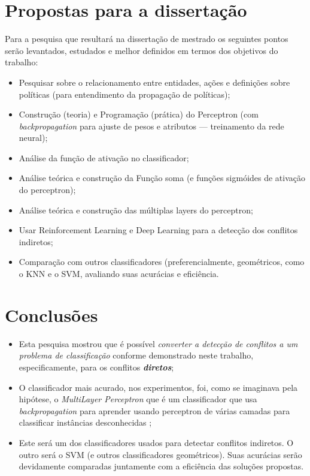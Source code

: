 \chapter{Propostas para a dissertação}\label{propostas}
Para a pesquisa que resultará na dissertação de mestrado os seguintes pontos serão levantados, estudados e melhor definidos em termos dos objetivos do trabalho:
\begin{itemize}
	\item Pesquisar sobre o relacionamento entre entidades, ações e definições sobre políticas (para entendimento da propagação de políticas);
	\item Construção (teoria) e Programação (prática) do Perceptron (com \textit{backpropagation} para ajuste de pesos e atributos --- treinamento da rede neural);
	\item Análise da função de ativação no classificador;
	\item Análise teórica e construção da Função soma (e funções sigmóides de ativação do perceptron);
	\item Análise teórica e construção das múltiplas layers do perceptron;
	\item Usar Reinforcement Learning e Deep Learning para a detecção dos conflitos indiretos;
	\item Comparação com outros classificadores (preferencialmente, geométricos, como o KNN e o SVM, avaliando suas acurácias e eficiência.
\end{itemize}

\chapter{Conclusões}\label{conclusoes}
\begin{itemize}
	\item Esta pesquisa mostrou que é possível \textit{converter a detecção de conflitos a um problema de classificação} conforme demonstrado neste trabalho, especificamente, para os conflitos \textbf{\textit{diretos}};
	\item O classificador mais acurado, nos experimentos, foi, como se imaginava pela hipótese, o \textit{MultiLayer Perceptron} que é um classificador que usa \textit{backpropagation} para aprender usando perceptron de várias camadas para classificar instâncias desconhecidas \cite{eibe2016};
	\item Este será um dos classificadores usados para detectar conflitos indiretos. O outro será o SVM (e outros classificadores geométricos). Suas acurácias serão devidamente comparadas juntamente com a eficiência das soluções propostas.
\end{itemize}
